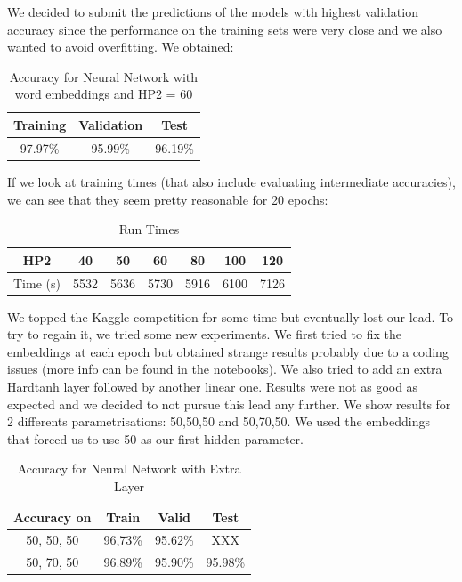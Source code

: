 \documentclass[11pt]{article}
\begin{document}
We decided to submit the predictions of the models with highest validation accuracy since the performance on the training sets were very close and we also wanted to avoid overfitting. We obtained:

\begin{table}[H]
\centering
\label{my-label2}
\begin{tabular}{|c|c|c|}
\hline
Training & Validation & Test    \\ \hline
97.97\%  & 95.99\%    & 96.19\% \\ \hline
\end{tabular}
\caption{Accuracy for Neural Network with word embeddings and HP2 = 60}
\end{table}

\noindent If we look at training times (that also include evaluating intermediate accuracies), we can see that they seem pretty reasonable for 20 epochs:\\

\begin{table}[H]
\centering
\label{my-label3}
\begin{tabular}{|c|c|c|c|c|c|c|}
\hline
HP2      & 40   & 50   & 60   & 80   & 100  & 120  \\ \hline
Time (s) & 5532 & 5636 & 5730 & 5916 & 6100 & 7126 \\ \hline
\end{tabular}
\caption{Run Times}
\end{table}

\noindent We topped the Kaggle competition for some time but eventually lost our lead. To try to regain it, we tried some new experiments. We first tried to fix the embeddings at each epoch but obtained strange results probably due to a coding issues (more info can be found in the notebooks). We also tried to add an extra Hardtanh layer followed by another linear one. Results were not as good as expected and we decided to not pursue this lead any further. We show results for 2 differents parametrisations: 50,50,50 and 50,70,50. We used the embeddings that forced us to use 50 as our first hidden parameter.

\begin{table}[H]
\centering

\label{my-label}
\begin{tabular}{|c|c|c|c|}
\hline
Accuracy on & \multicolumn{1}{c|}{Train} & \multicolumn{1}{c|}{Valid} & Test    \\ \hline
50, 50, 50  & 96,73\%                    & 95.62\%                    & XXX     \\ \hline
50, 70, 50  & 96.89\%                    & 95.90\%                    & 95.98\% \\ \hline
\end{tabular}
\caption{Accuracy for Neural Network with Extra Layer}
\end{table}
\end{document}
